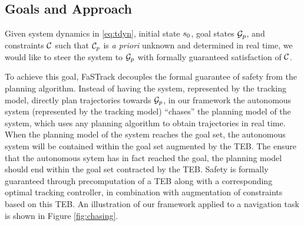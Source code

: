 
\subsection{Goals and Approach}
Given system dynamics in \eqref{eq:tdyn}, initial state $s_0$, goal states $\mathcal G_p$, and constraints $\mathcal C$ such that $\mathcal C_p$ is \textit{a priori} unknown and determined in real time, we would like to steer the system to $\mathcal G_p$ with formally guaranteed satisfaction of $\mathcal C$.

To achieve this goal, FaSTrack decouples the formal guarantee of safety from the planning algorithm.
Instead of having the system, represented by the tracking model, directly plan trajectories towards $\mathcal G_p$, in our framework the autonomous system (represented by the tracking model) ``chases'' the planning model of the system, which uses any planning algorithm to obtain trajectories in real time.
When the planning model of the system reaches the goal set, the autonomous system will be contained within the goal set augmented by the TEB. The ensure that the autonomous sytem has in fact reached the goal, the planning model should end within the goal set contracted by the TEB.
Safety is formally guaranteed through precomputation of a TEB along with a corresponding optimal tracking controller, in combination with augmentation of constraints based on this TEB.
An illustration of our framework applied to a navigation task is shown in Figure \ref{fig:chasing}.
